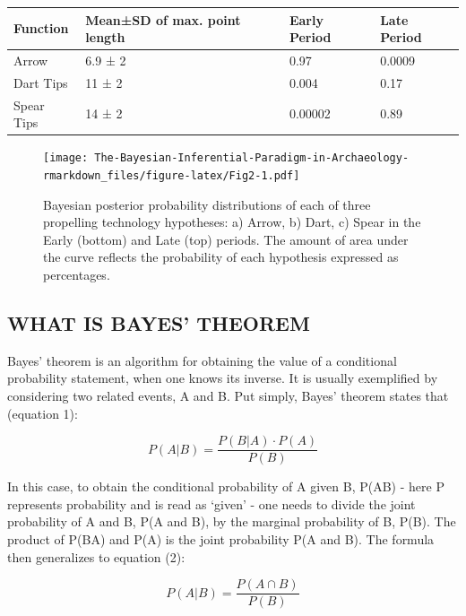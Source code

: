 \documentclass[
]{article}
\begin{document}
\begin{longtable}[]{@{}llll@{}}
\toprule
Function & Mean±SD of max. point length & Early Period & Late Period \\
\midrule
\endhead
Arrow & 6.9 ± 2 & 0.97 & 0.0009 \\
Dart Tips & 11 ± 2 & 0.004 & 0.17 \\
Spear Tips & 14 ± 2 & 0.00002 & 0.89 \\
\bottomrule
\end{longtable}

\begin{figure}
\centering
\texttt{[image: The-Bayesian-Inferential-Paradigm-in-Archaeology-rmarkdown\_files/figure-latex/Fig2-1.pdf]}
\caption{Bayesian posterior probability distributions of each of three
propelling technology hypotheses: a) Arrow, b) Dart, c) Spear in the
Early (bottom) and Late (top) periods. The amount of area under the
curve reflects the probability of each hypothesis expressed as
percentages.}
\end{figure}

\newpage

\hypertarget{what-is-bayes-theorem}{%
\subsection{\texorpdfstring{\hfil WHAT IS BAYES'
THEOREM\hfil}{WHAT IS BAYES' THEOREM}}\label{what-is-bayes-theorem}}

Bayes' theorem is an algorithm for obtaining the value of a conditional
probability statement, when one knows its inverse. It is usually
exemplified by considering two related events, A and B. Put simply,
Bayes' theorem states that (equation 1):

\begin{equation}
P(A|B) = \frac{P(B|A)\cdot P(A)}{P(B)}
\label{eg:1}
\end{equation}

In this case, to obtain the conditional probability of A given B,
P(A\textbar B) - here P represents probability and \textbar{} is read as
`given' - one needs to divide the joint probability of A and B, P(A and
B), by the marginal probability of B, P(B). The product of
P(B\textbar A) and P(A) is the joint probability P(A and B). The formula
then generalizes to equation (2):

\begin{equation}
P(A|B) = \frac{P(A \cap B)}{P(B)}
\label{eg:2}
\end{equation}
\end{document}
